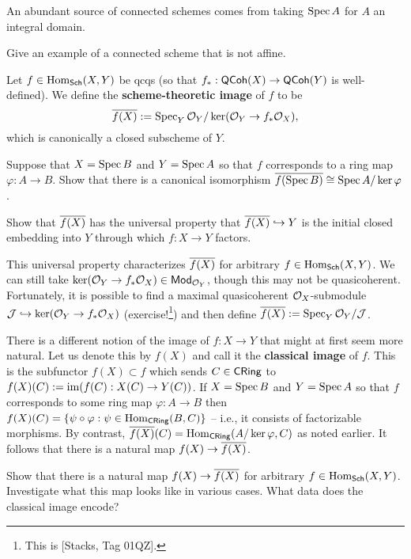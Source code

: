 \documentclass[11pt]{article}
\newcommand{\J}{\mathcal{J}}
\renewcommand{\phi}{\varphi}
\begin{document}
\begin{example}
An abundant source of connected schemes comes from taking $\operatorname{Spec} A$ for $A$ an integral domain.
\end{example}

\begin{exercise}
Give an example of a connected scheme that is not affine.
\end{exercise}

Let $f\in\operatorname{Hom}_{\operatorname{\mathsf{Sch}}}(X,Y)$ be qcqs (so that $f_*: \operatorname{\mathsf{QCoh}}(X)\to\operatorname{\mathsf{QCoh}}(Y)$ is well-defined). We define the \textbf{scheme-theoretic image} of $f$ to be 
$$\overline{f(X)}:=\operatorname{Spec}_Y\mathcal{O}_Y/\ker(\mathcal{O}_Y\to f_*\mathcal{O}_X),$$
which is canonically a closed subscheme of $Y$. 

\begin{exercise}
Suppose that $X=\operatorname{Spec} B$ and $Y=\operatorname{Spec} A$ so that $f$ corresponds to a ring map $\phi: A\to B$. Show that there is a canonical isomorphism $\ov{f(\Spec B)}\iso\Spec A/\ker\phi$.
\end{exercise}

\begin{exercise}
Show that $\overline{f(X)}$ has the universal property that $\overline{f(X)}\hookrightarrow Y$ is the initial closed embedding into $Y$ through which $f: X\to Y$ factors.
\end{exercise}

This universal property characterizes $\overline{f(X)}$ for arbitrary $f\in\operatorname{Hom}_{\operatorname{\mathsf{Sch}}}(X,Y)$. We can still take $\ker(\mathcal{O}_Y\to f_*\mathcal{O}_X)\in\operatorname{\mathsf{Mod}}_{\mathcal{O}_Y}$, though this may not be quasicoherent. Fortunately, it is possible to find a maximal quasicoherent $\mathcal{O}_X$-submodule $\J\inj\ker(\O_Y\to f_*\O_X)$ (exercise!\footnote{This is [Stacks, Tag 01QZ].}) and then define $\ov{f(X)}:=\Spec_Y\O_Y/\J$.

\begin{remark}
There is a different notion of the image of $f: X\to Y$ that might at first seem more natural. Let us denote this by $f(X)$ and call it the \textbf{classical image} of $f$. This is the subfunctor $f(X)\subset f$ which sends $C\in\operatorname{\mathsf{CRing}}$ to $f(X)(C):=\operatorname{im}(f(C): X(C)\to Y(C))$. If $X=\operatorname{Spec} B$ and $Y=\operatorname{Spec} A$ so that $f$ corresponds to some ring map $\phi: A\to B$ then $f(X)(C)=\{\psi\circ\phi : \psi\in\Hom_{\CRing}(B,C)\}$ -- i.e., it consists of factorizable morphisms. By contrast, $\ov{f(X)}(C)=\Hom_{\CRing}(A/\ker\phi,C)$ as noted earlier. It follows that there is a natural map $f(X)\to\overline{f(X)}$.
\end{remark}

\begin{exercise}
Show that there is a natural map $f(X)\to\overline{f(X)}$ for arbitrary $f\in\operatorname{Hom}_{\operatorname{\mathsf{Sch}}}(X,Y)$. Investigate what this map looks like in various cases. What data does the classical image encode?
\end{exercise}
\end{document}
